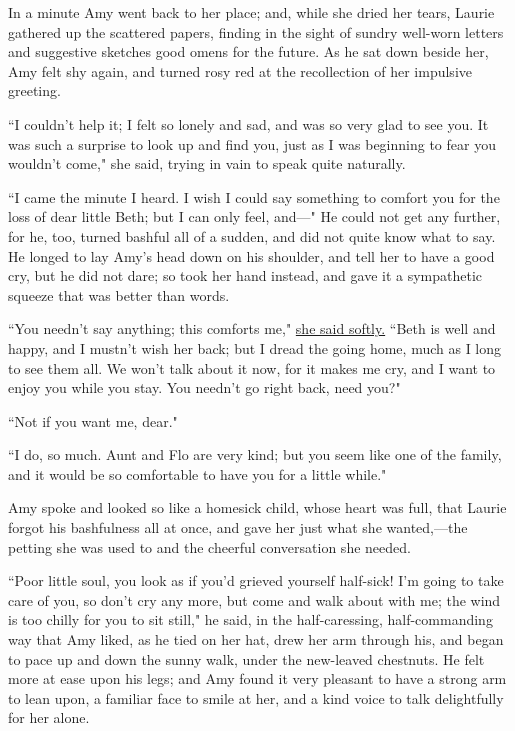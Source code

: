 In a minute Amy went back to her place; and, while she dried her tears,
Laurie gathered up the scattered papers, finding in the sight of sundry
well-worn letters and suggestive sketches good omens for the future. As
he sat down beside her, Amy felt shy again, and turned rosy red at the
recollection of her impulsive greeting.

``I couldn't help it; I felt so lonely and sad, and was
so very glad to see you. It was such a surprise to look up and find you,
just as I was beginning to fear you wouldn't come," she
said, trying in vain to speak quite naturally.

``I came the minute I heard. I wish I could say something to comfort you
for the loss of dear little Beth; but I can only feel, and---" He could
not get any further, for he, too, turned bashful all of a sudden, and
did not quite know what to say. He longed to lay Amy's
head down on his shoulder, and tell her to have a good cry, but he did
not dare; so took her hand instead, and gave it a sympathetic squeeze
that was better than words.

``You needn't say anything; this comforts me," \underline{she
said softly.} ``Beth is well and happy, and I mustn't
wish her back; but I dread the going home, much as I long to see them
all. We won't talk about it now, for it makes me cry,
and I want to enjoy you while you stay. You needn't go
right back, need you?"

``Not if you want me, dear."

``I do, so much. Aunt and Flo are very kind; but you seem like one of the
family, and it would be so comfortable to have you for a little while."

Amy spoke and looked so like a homesick child, whose heart was full,
that Laurie forgot his bashfulness all at once, and gave her just what
she wanted,---the petting she was used to and the cheerful conversation
she needed.

``Poor little soul, you look as if you'd grieved yourself
half-sick! I'm going to take care of you, so
don't cry any more, but come and walk about with me; the
wind is too chilly for you to sit still," he said, in the
half-caressing, half-commanding way that Amy liked, as he tied on her
hat, drew her arm through his, and began to pace up and down the sunny
walk, under the new-leaved chestnuts. He felt more at ease upon his
legs; and Amy found it very pleasant to have a strong arm to lean upon,
a familiar face to smile at her, and a kind voice to talk delightfully
for her alone.

